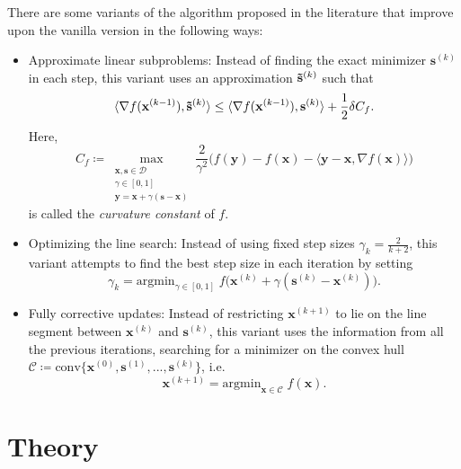 \documentclass[12pt]{article}
\begin{document}
There are some variants of the algorithm proposed in the literature that improve upon the vanilla version in the following ways:
\begin{itemize}
    \item Approximate linear subproblems: Instead of finding the exact minimizer $\mathbf{s}^{(k)}$ in each step, this variant uses an approximation $\mathbf{\Tilde{s}}^{(k)}$ such that
    \begin{equation}\label{eq2}
        \langle \nabla f(\mathbf{x}^{(k-1)}), \mathbf{\Tilde{s}}^{(k)} \rangle \leq \langle \nabla f(\mathbf{x}^{(k-1)}), \mathbf{{s}}^{(k)} \rangle + \frac{1}{2} \delta C_f.
    \end{equation}
    Here,
    \begin{equation}
        C_f \coloneqq \max_{\substack{\mathbf{x},\mathbf{s} \in \mathcal{D} \\ \gamma \in [0,1] \\ \mathbf{y} = \mathbf{x} + \gamma (\mathbf{s} - \mathbf{x})}} \frac{2}{\gamma^2} \big( f(\mathbf{y}) - f(\mathbf{x}) - \langle \mathbf{y}-\mathbf{x}, \nabla f(\mathbf{x}) \rangle \big)
    \end{equation}
    is called the \textit{curvature constant} of $f$.
    \item Optimizing the line search: Instead of using fixed step sizes $\gamma_k = \frac{2}{k+2}$, this variant attempts to find the best step size in each iteration by setting
    \begin{equation}
        \gamma_k = \mathrm{argmin}_{\gamma \in [0,1]} \; f \big( \mathbf{x}^{(k)} + \gamma (\mathbf{s}^{(k)} - \mathbf{x}^{(k)}) \big).
    \end{equation}
    
    \item Fully corrective updates: Instead of restricting $\mathbf{x}^{(k+1)}$ to lie on the line segment between $\mathbf{x}^{(k)}$ and $\mathbf{s}^{(k)}$, this variant uses the information from all the previous iterations, searching for a minimizer on the convex hull $\mathcal{C} \coloneqq \mathrm{conv} \{\mathbf{x}^{(0)}, \mathbf{s}^{(1)},...,\mathbf{s}^{(k)}\}$, i.e.
    \begin{equation}
        \mathbf{x}^{(k+1)} = \mathrm{argmin}_{\mathbf{x} \in \mathcal{C}} \; f(\mathbf{x}). 
    \end{equation}
\end{itemize}

\section{Theory}
\end{document}
